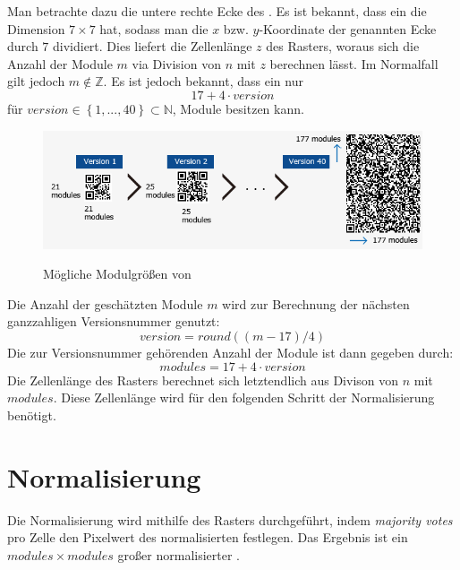 Man betrachte dazu die untere rechte Ecke des \olfpn. Es ist bekannt, dass ein \fp die Dimension $7 \times 7$ hat, sodass man die $x$ bzw. $y$-Koordinate der genannten Ecke durch $7$ dividiert. Dies liefert die Zellenlänge $z$ des Rasters, woraus sich die Anzahl der Module $m$ via Division von $n$ mit $z$ berechnen lässt. Im Normalfall gilt jedoch $m \notin \mathbb{Z}$.
Es ist jedoch bekannt, dass ein \QRCode nur 
\begin {equation*}
	17 + 4 \cdot version
\end{equation*}
für $version \in \left\{1, ..., 40\right\} \subset \mathbb{N}$, Module besitzen kann.
\begin{figure}[h]
\centering
\includegraphics[scale=0.5]{images/QRVersion.png}
\label{fig:version-qrcode}
\caption{Mögliche Modulgrößen von \QRCodes}
\end{figure}

\noindent Die Anzahl der geschätzten Module $m$ wird zur Berechnung der nächsten ganzzahligen Versionsnummer genutzt:
\begin{equation*}
	version = round((m-17)/4)
\end{equation*}
Die zur Versionsnummer gehörenden Anzahl der Module ist dann gegeben durch:
\begin{equation*}
	modules = 17+4 \cdot version
\end{equation*} 
Die Zellenlänge des Rasters berechnet sich letztendlich aus Divison von $n$ mit $modules$. Diese Zellenlänge wird für den folgenden Schritt der Normalisierung benötigt.

\section{Normalisierung}
Die Normalisierung wird mithilfe des Rasters durchgeführt, indem \emph{majority votes} pro Zelle den Pixelwert des normalisierten \QRCodes festlegen.
Das Ergebnis ist ein $modules \times modules$ großer normalisierter \QRCode.

